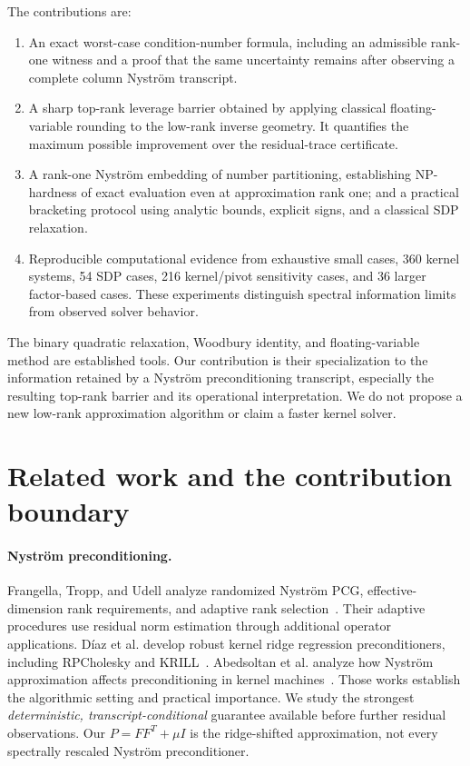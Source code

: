 \documentclass[final,leqno,letterpaper]{etna}
\begin{document}
The contributions are:
\begin{enumerate}
\item An exact worst-case condition-number formula, including an admissible rank-one witness and a proof that the same uncertainty remains after observing a complete column Nystr\"om transcript.
\item A sharp top-rank leverage barrier obtained by applying classical floating-variable rounding to the low-rank inverse geometry. It quantifies the maximum possible improvement over the residual-trace certificate.
\item A rank-one Nystr\"om embedding of number partitioning, establishing NP-hardness of exact evaluation even at approximation rank one; and a practical bracketing protocol using analytic bounds, explicit signs, and a classical SDP relaxation.
\item Reproducible computational evidence from exhaustive small cases, 360 kernel systems, 54 SDP cases, 216 kernel/pivot sensitivity cases, and 36 larger factor-based cases. These experiments distinguish spectral information limits from observed solver behavior.
\end{enumerate}
The binary quadratic relaxation, Woodbury identity, and floating-variable method are established tools. Our contribution is their specialization to the information retained by a Nystr\"om preconditioning transcript, especially the resulting top-rank barrier and its operational interpretation. We do not propose a new low-rank approximation algorithm or claim a faster kernel solver.

\section{Related work and the contribution boundary}
\paragraph{Nystr\"om preconditioning.}
Frangella, Tropp, and Udell analyze randomized Nystr\"om PCG, effective-dimension rank requirements, and adaptive rank selection~\cite{ftu}. Their adaptive procedures use residual norm estimation through additional operator applications. D\'iaz et al. develop robust kernel ridge regression preconditioners, including RPCholesky and KRILL~\cite{diaz}. Abedsoltan et al. analyze how Nystr\"om approximation affects preconditioning in kernel machines~\cite{abed}. Those works establish the algorithmic setting and practical importance. We study the strongest \emph{deterministic, transcript-conditional} guarantee available before further residual observations. Our $P=FF^T+\mu I$ is the ridge-shifted approximation, not every spectrally rescaled Nystr\"om preconditioner.
\end{document}
